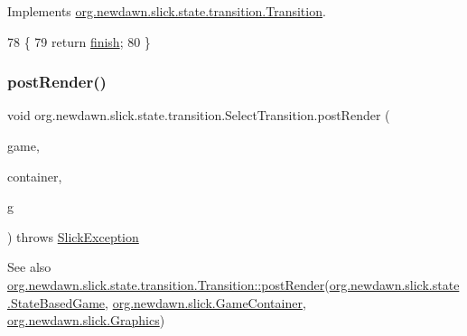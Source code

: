 Implements \mbox{\hyperlink{interfaceorg_1_1newdawn_1_1slick_1_1state_1_1transition_1_1_transition_af397d5185cf09c30c3f51d5021d63815}{org.\+newdawn.\+slick.\+state.\+transition.\+Transition}}.


\begin{DoxyCode}
78                                 \{
79         \textcolor{keywordflow}{return} \mbox{\hyperlink{classorg_1_1newdawn_1_1slick_1_1state_1_1transition_1_1_select_transition_a449baeee9125b0fe5c20c8097b1aab8a}{finish}};
80     \}
\end{DoxyCode}
\mbox{\label{classorg_1_1newdawn_1_1slick_1_1state_1_1transition_1_1_select_transition_ab8383cc1738214b1408eef07cab39df1}} 
\subsubsection{\texorpdfstring{post\+Render()}{postRender()}}
{\footnotesize\ttfamily void org.\+newdawn.\+slick.\+state.\+transition.\+Select\+Transition.\+post\+Render (\begin{DoxyParamCaption}\item[{\mbox{\hyperlink{classorg_1_1newdawn_1_1slick_1_1state_1_1_state_based_game}{State\+Based\+Game}}}]{game,  }\item[{\mbox{\hyperlink{classorg_1_1newdawn_1_1slick_1_1_game_container}{Game\+Container}}}]{container,  }\item[{\mbox{\hyperlink{classorg_1_1newdawn_1_1slick_1_1_graphics}{Graphics}}}]{g }\end{DoxyParamCaption}) throws \mbox{\hyperlink{classorg_1_1newdawn_1_1slick_1_1_slick_exception}{Slick\+Exception}}\hspace{0.3cm}{\ttfamily [inline]}}

\begin{DoxySeeAlso}{See also}
\mbox{\hyperlink{interfaceorg_1_1newdawn_1_1slick_1_1state_1_1transition_1_1_transition_ac113f4d5a19962a62a8adec7f9ab5d47}{org.\+newdawn.\+slick.\+state.\+transition.\+Transition\+::post\+Render}}(\mbox{\hyperlink{classorg_1_1newdawn_1_1slick_1_1state_1_1_state_based_game}{org.\+newdawn.\+slick.\+state.\+State\+Based\+Game}}, \mbox{\hyperlink{classorg_1_1newdawn_1_1slick_1_1_game_container}{org.\+newdawn.\+slick.\+Game\+Container}}, \mbox{\hyperlink{classorg_1_1newdawn_1_1slick_1_1_graphics}{org.\+newdawn.\+slick.\+Graphics}}) 
\end{DoxySeeAlso}


